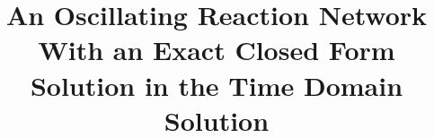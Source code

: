 \documentclass{bmcart}
\begin{document}
\begin{frontmatter}

\begin{fmbox}



\title{An Oscillating Reaction Network With an Exact Closed Form Solution in the Time Domain Solution}


\author[
  addressref={aff1},                   %
  corref={aff1},
  email={jlheller@uw.edu}
]{ }


\address[id=aff1]{%
  ,             %
  ,          %
  ,                              %
}


\end{fmbox}
\end{frontmatter}
\end{document}
